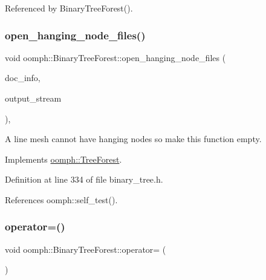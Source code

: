 Referenced by Binary\+Tree\+Forest().

\mbox{\label{classoomph_1_1BinaryTreeForest_a3567e04e401c5abc64dff4280e93d592}} 
\subsubsection{\texorpdfstring{open\+\_\+hanging\+\_\+node\+\_\+files()}{open\_hanging\_node\_files()}}
{\footnotesize\ttfamily void oomph\+::\+Binary\+Tree\+Forest\+::open\+\_\+hanging\+\_\+node\+\_\+files (\begin{DoxyParamCaption}\item[{\hyperlink{classoomph_1_1DocInfo}{Doc\+Info} \&}]{doc\+\_\+info,  }\item[{\hyperlink{classoomph_1_1Vector}{Vector}$<$ std\+::ofstream $\ast$$>$ \&}]{output\+\_\+stream }\end{DoxyParamCaption})\hspace{0.3cm}{\ttfamily [inline]}, {\ttfamily [virtual]}}



A line mesh cannot have hanging nodes so make this function empty. 



Implements \hyperlink{classoomph_1_1TreeForest_a384793832d8ab83e23636597e5fe1e1a}{oomph\+::\+Tree\+Forest}.



Definition at line 334 of file binary\+\_\+tree.\+h.



References oomph\+::self\+\_\+test().

\mbox{\label{classoomph_1_1BinaryTreeForest_a85517fbf448db0f571972d9c389ce6dd}} 
\subsubsection{\texorpdfstring{operator=()}{operator=()}}
{\footnotesize\ttfamily void oomph\+::\+Binary\+Tree\+Forest\+::operator= (\begin{DoxyParamCaption}\item[{const \hyperlink{classoomph_1_1BinaryTreeForest}{Binary\+Tree\+Forest} \&}]{ }\end{DoxyParamCaption})\hspace{0.3cm}{\ttfamily [inline]}}



